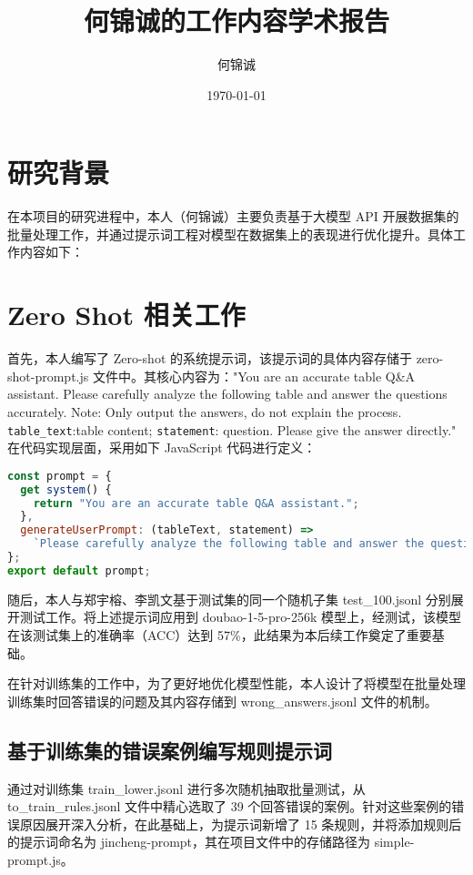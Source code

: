\documentclass[12pt,a4paper]{ctexart}
\begin{document}
\title{何锦诚的工作内容学术报告}
\author{何锦诚}
\date{\today}
\maketitle

\section{研究背景}
在本项目的研究进程中，本人（何锦诚）主要负责基于大模型 API 开展数据集的批量处理工作，并通过提示词工程对模型在数据集上的表现进行优化提升。具体工作内容如下：

\section{Zero Shot 相关工作}
首先，本人编写了 Zero-shot 的系统提示词，该提示词的具体内容存储于 zero-shot-prompt.js 文件中。其核心内容为："You are an accurate table Q\&A assistant. Please carefully analyze the following table and answer the questions accurately. Note: Only output the answers, do not explain the process. \texttt{table\_text}:table content; \texttt{statement}: question. Please give the answer directly." 在代码实现层面，采用如下 JavaScript 代码进行定义：

\begin{lstlisting}[language=JavaScript]
const prompt = {
  get system() {
    return "You are an accurate table Q&A assistant.";
  },
  generateUserPrompt: (tableText, statement) =>
    `Please carefully analyze the following table and answer the questions accurately. Note: Only output the answers, do not explain the process.\n\nTable Content: ${tableText}\n\nQuestion：${statement}\n\nPlease give the answer directly.`,
};
export default prompt;
\end{lstlisting}

随后，本人与郑宇榕、李凯文基于测试集的同一个随机子集 test\_100.jsonl 分别展开测试工作。将上述提示词应用到 doubao-1-5-pro-256k 模型上，经测试，该模型在该测试集上的准确率（ACC）达到 57\%，此结果为本后续工作奠定了重要基础。

在针对训练集的工作中，为了更好地优化模型性能，本人设计了将模型在批量处理训练集时回答错误的问题及其内容存储到 wrong\_answers.jsonl 文件的机制。

\subsection{基于训练集的错误案例编写规则提示词}
通过对训练集 train\_lower.jsonl 进行多次随机抽取批量测试，从 to\_train\_rules.jsonl 文件中精心选取了 39 个回答错误的案例。针对这些案例的错误原因展开深入分析，在此基础上，为提示词新增了 15 条规则，并将添加规则后的提示词命名为 jincheng-prompt，其在项目文件中的存储路径为 simple-prompt.js。
\end{document}
